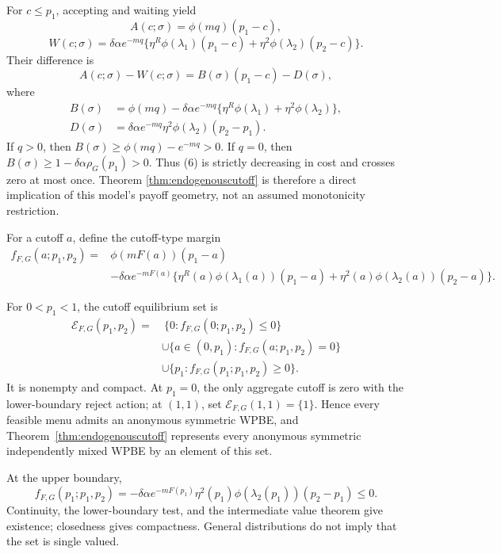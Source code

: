 \documentclass[mnsc,blindrev]{informs3}
\newcommand{\calE}{\mathcal E}
\newcommand{\ph}{\phi}
\begin{document}
For \(c\le p_1\), accepting and waiting yield
\[
 A(c;\sigma)=\ph(mq)(p_1-c),
\]
\[
 W(c;\sigma)=\delta\alpha e^{-mq}\{
 \eta^R\ph(\lambda_1)(p_1-c)
 +\eta^2\ph(\lambda_2)(p_2-c)\}.
\]
Their difference is
\[
 A(c;\sigma)-W(c;\sigma)
 =B(\sigma)(p_1-c)-D(\sigma),                              \tag{6}
\]
where
\[
\begin{aligned}
 B(\sigma)&=\ph(mq)-\delta\alpha e^{-mq}
  \{\eta^R\ph(\lambda_1)+\eta^2\ph(\lambda_2)\},\\
 D(\sigma)&=\delta\alpha e^{-mq}\eta^2\ph(\lambda_2)
  (p_2-p_1).
\end{aligned}
\]
If \(q>0\), then \(B(\sigma)\ge\ph(mq)-e^{-mq}>0\).  If \(q=0\),
then \(B(\sigma)\ge1-\delta\alpha\rho_G(p_1)>0\).  Thus (6) is strictly
decreasing in cost and crosses zero at most once.  Theorem
\ref{thm:endogenouscutoff} is therefore a direct implication of this model's
payoff geometry, not an assumed monotonicity restriction.

For a cutoff \(a\), define the cutoff-type margin
\[
\begin{aligned}
 f_{F,G}(a;p_1,p_2)
={}&\ph(mF(a))(p_1-a)\\
&-\delta\alpha e^{-mF(a)}
 \{\eta^R(a)\ph(\lambda_1(a))(p_1-a)
 +\eta^2(a)\ph(\lambda_2(a))(p_2-a)\}.
\end{aligned}                                             \tag{7}
\]

\begin{theorem}
\label{prop:wpbe}
For \(0<p_1<1\), the cutoff equilibrium set is
\[
\begin{aligned}
 \calE_{F,G}(p_1,p_2)
 =&\ \{0:f_{F,G}(0;p_1,p_2)\le0\}\\
 &\cup\{a\in(0,p_1):f_{F,G}(a;p_1,p_2)=0\}\\
 &\cup\{p_1:f_{F,G}(p_1;p_1,p_2)\ge0\}.
\end{aligned}                                             \tag{8}
\]
It is nonempty and compact.  At \(p_1=0\), the only aggregate cutoff is zero
with the lower-boundary reject action; at \((1,1)\), set
\(\calE_{F,G}(1,1)=\{1\}\).  Hence every feasible menu admits an anonymous
symmetric WPBE, and Theorem~\ref{thm:endogenouscutoff} represents every
anonymous symmetric independently mixed WPBE by an element of this set.
\end{theorem}

At the upper boundary,
\[
 f_{F,G}(p_1;p_1,p_2)=
 -\delta\alpha e^{-mF(p_1)}\eta^2(p_1)
 \ph(\lambda_2(p_1))(p_2-p_1)\le0.
\]
Continuity, the lower-boundary test, and the intermediate value theorem give
existence; closedness gives compactness.  General distributions do not imply
that the set is single valued.
\end{document}

